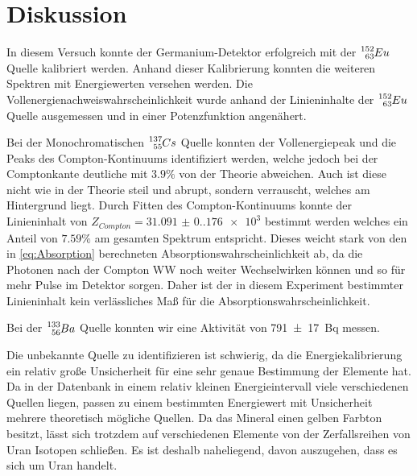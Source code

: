 \newpage
\section{Diskussion}

In diesem Versuch konnte der Germanium-Detektor erfolgreich mit der
$\ce{^{152}_{63}}Eu$ Quelle kalibriert werden. Anhand dieser Kalibrierung
konnten die weiteren Spektren mit Energiewerten versehen werden. Die
Vollenergienachweiswahrscheinlichkeit wurde anhand der Linieninhalte der
$\ce{^{152}_{63}}Eu$ Quelle ausgemessen und in einer Potenzfunktion angenähert.

Bei der Monochromatischen $\ce{^{137}_{55}}Cs$ Quelle konnten der
Vollenergiepeak und die Peaks des Compton-Kontinuums identifiziert werden,
welche jedoch bei der Comptonkante deutliche mit $3.9\%$ von der Theorie
abweichen. Auch ist diese nicht wie in der Theorie steil und abrupt, sondern
verrauscht, welches am Hintergrund liegt. Durch Fitten des Compton-Kontinuums
konnte der Linieninhalt von $Z_{Compton}=\num{31.091(0.176)e3}$ bestimmt werden
welches ein Anteil von $7.59\%$ am gesamten Spektrum entspricht. Dieses weicht
stark von den in \eqref{eq:Absorption} berechneten
Absorptionswahrscheinlichkeit ab, da die Photonen nach der Compton WW noch
weiter Wechselwirken können und so für mehr Pulse im Detektor sorgen. 
Daher ist der in diesem Experiment bestimmter Linieninhalt kein verlässliches Maß für die Absorptionswahrscheinlichkeit.

Bei der $\ce{^{133}_{56}}Ba$ Quelle konnten wir eine Aktivität von
\qty{791(17)}{\becquerel} messen. 

Die unbekannte Quelle zu identifizieren ist schwierig, da die
Energiekalibrierung ein relativ große Unsicherheit für eine sehr genaue Bestimmung
der Elemente hat. Da in der Datenbank in einem relativ kleinen Energieintervall
viele verschiedenen Quellen liegen, passen zu einem bestimmten Energiewert mit Unsicherheit mehrere theoretisch mögliche Quellen. 
Da das Mineral einen gelben Farbton besitzt, lässt sich trotzdem auf verschiedenen Elemente von der Zerfallsreihen von Uran Isotopen schließen. 
Es ist deshalb naheliegend, davon auszugehen, dass es sich um Uran handelt.

\newpage
\printbibliography

